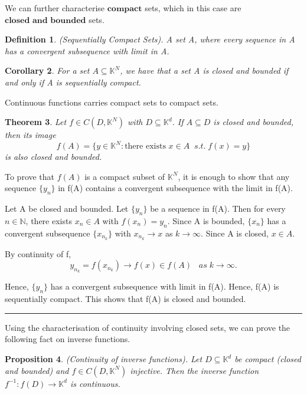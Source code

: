 \documentclass[twoside]{article}
\newcounter{lecnum}
\newtheorem{theorem}{Theorem}[lecnum]
\newtheorem{proposition}[theorem]{Proposition}
\newtheorem{corollary}[theorem]{Corollary}
\newtheorem{definition}[theorem]{Definition}
\newenvironment{proof}{{\bf Proof:}}{\hfill\rule{2mm}{2mm}}
\begin{document}
We can further characterise $\textbf{compact}$ sets, which in this case are $\textbf{closed and bounded}$ sets.

\begin{definition}(Sequentially Compact Sets). A set A, where every sequence in A has a convergent subsequence with limit in A.
\end{definition}

\begin{corollary} For a set $A \subseteq \mathbb{K}^N$, we have that a set A is closed and bounded if and only if A is sequentially compact.
\end{corollary}

\bigskip
Continuous functions carries compact sets to compact sets.

\begin{theorem}Let $f \in C(D, \mathbb{K}^N)$ with $D \subseteq \mathbb{K}^d$. If $A \subseteq D$ is closed and bounded, then its image $$f(A) = \{y \in \mathbb{K}^N: \text{there exists } x \in A \;\;s.t. \; f(x) = y\}$$ is also closed and bounded.
\end{theorem}

\begin{proof}
To prove that $f(A)$ is a compact subset of $\mathbb{K}^N$, it is enough to show that any sequence $\{y_n\}$ in f(A) contains a convergent subsequence with the limit in f(A).

Let A be closed and bounded. Let $\{y_n\}$ be a sequence in f(A). Then for every $n \in \mathbb{N}$, there exists $x_n \in A$ with $f(x_n) = y_n$. Since A is bounded, $\{x_n\}$ has a convergent subsequence $\{x_{n_k}\}$ with $x_{n_k} \rightarrow x$ as $k \rightarrow \infty$. Since A is closed, $x \in A$. 

By continuity of f, 
$$
y_{n_k} = f(x_{n_k}) \rightarrow f(x) \in f(A) \;\;\; as \;k \rightarrow \infty.
$$

Hence, $\{y_n\}$ has a convergent subsequence with limit in f(A). Hence, f(A) is sequentially compact. This shows that f(A) is closed and bounded.
\end{proof}

Using the characterisation of continuity involving closed sets, we can prove the following fact on inverse functions.

\begin{proposition}(Continuity of inverse functions). Let $D \subseteq \mathbb{K}^d$ be compact (closed and bounded) and $f \in C(D, \mathbb{K}^N)$ injective. Then the inverse function $f^{-1}: f(D) \rightarrow \mathbb{K}^d$ is continuous.
\end{proposition}
\end{document}
